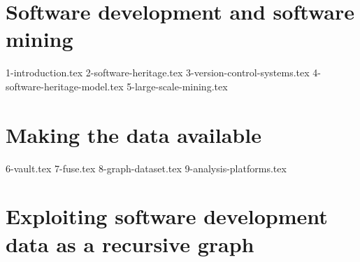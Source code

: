 \documentclass[a4paper,11pt,openbib,draft]{memoir}
\begin{document}
\raggedbottom

\frontmatter
{}
%

\clearemptydoublepage

%

\clearemptydoublepage
%

\clearemptydoublepage
%


\renewcommand{\contentsname}{Table of Contents}
\tableofcontents*
{}
%

\iffalse
\listoftables
\addtocontents{lot}{\par\nobreak\textbf{{\scshape Table} \hfill Page}\par\nobreak}
\clearemptydoublepage
\listoffigures
\addtocontents{lof}{\par\nobreak\textbf{{\scshape Figure} \hfill Page}\par\nobreak}
\clearemptydoublepage
\fi
%
%
\mainmatter
%


\part{Software development and software mining}

{1-introduction.tex}
{2-software-heritage.tex}
{3-version-control-systems.tex}
{4-software-heritage-model.tex}
{5-large-scale-mining.tex}

\part{Making the data available}

{6-vault.tex}
{7-fuse.tex}
{8-graph-dataset.tex}
\iffalse
{9-analysis-platforms.tex}

\part{Exploiting software development data as a recursive graph}
\end{document}

